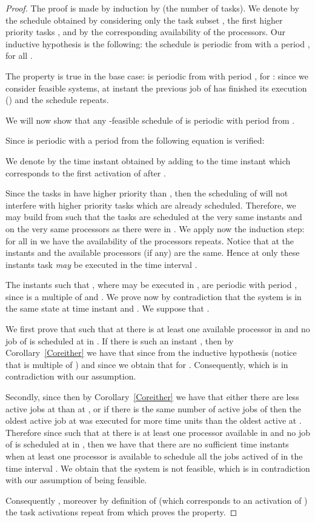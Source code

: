 \documentclass[a4paper,11pt]{article}
\begin{document}
\begin{proof}
  The proof is made by induction by  (the number of tasks). We
  denote by  the schedule obtained by considering only
  the task subset , the first higher priority  tasks
  , and by  the corresponding
  availability of the processors. Our inductive hypothesis is the
  following: the schedule  is periodic from 
  with a period , for all .

  The property is true in the base case:  is periodic
  from  with period , for :
  since we consider feasible systems, at instant  the
  previous job of  has finished its execution () and the schedule repeats.

  We will now show that any -feasible schedule of 
  is periodic with period  from .

  Since  is periodic with a period  from  the
  following equation is verified:



We denote by  the time
instant obtained by adding  to the time instant which
corresponds to the first activation of  after .

Since the tasks in  have higher priority than
, then the scheduling of  will not interfere
with higher priority tasks which are already scheduled. Therefore, we
may build  from  such that the tasks
 are scheduled at the very same
instants and on the very same processors as there were in
. We apply now the induction step: for all  in  we have  the
availability of the processors repeats. Notice that at the instants
 and  the available processors (if any) are the same. Hence
at only these instants task  {\em may} be executed in the
time interval . 

The instants  such that , where
 may be executed in , are periodic with
period , since  is a multiple of  and . We prove now by contradiction that the system is in the
same state at time instant  and . We suppose that  .

We first prove that  such
that at  there is at least one available processor in
 and no job of  is scheduled at  in
. If there is such an instant , then by
Corollary~\ref{Coreither} we have that  since from the inductive hypothesis (notice that
 is multiple of ) and since  we obtain that
 for . Consequently,  which is
in contradiction with our assumption.

Secondly, since  then by Corollary~\ref{Coreither} we
have that either there are less active jobs at  than at
, or if there is the same number of active jobs of
 then the oldest active job at  was executed for
more time units than the oldest active at . Therefore
since  such that at 
there is at least one processor available in  and no job
of  is scheduled at  in , then we have
that there are no sufficient time instants when at least one processor
is available to schedule all the jobs actived of  in the
time interval . We obtain that the system
is not feasible, which is in contradiction with our assumption of
 being feasible.

Consequently , moreover by
definition of  (which corresponds to an activation of
) the task activations repeat from  which proves
the property.
\end{proof}
\end{document}
